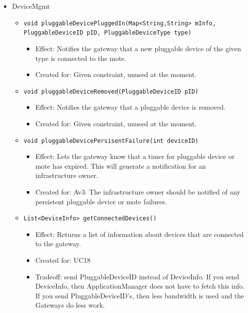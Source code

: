 \begin{itemize}
            \item DeviceMgmt
            \begin{itemize}
                \item \texttt{void pluggableDevicePluggedIn(Map<String,String> mInfo,
                                                            PluggableDeviceID pID,
                                                            PluggableDeviceType type)}
                    \begin{itemize}
                        \item Effect: Notifies the gateway that a new pluggable device
                              of the given type is connected to the mote.
                        \item Created for: Given constraint, unused at the moment.
                    \end{itemize}
                \item \texttt{void pluggableDeviceRemoved(PluggableDeviceID pID)}
                    \begin{itemize}
                        \item Effect: Notifies the gateway that a pluggable device is removed.
                        \item Created for: Given constraint, unused at the moment.
                    \end{itemize}
                \item \texttt{void pluggableDevicePersisentFailure(int deviceID)}
                    \begin{itemize}
                        \item Effect: Lets the gateway know that a timer for pluggable device or mote has expired.
                              This will generate a notification for an infrastructure owner.
                        \item Created for: Av3: The infrastructure owner should be notified of
                              any persistent pluggable device or mote failures.
                    \end{itemize}
                \item \texttt{List<DeviceInfo> getConnectedDevices()}
                    \begin{itemize}
                        \item Effect: Returns a list of information about devices that are connected to the gateway.
                        \item Created for: UC18
                        \item Tradeoff: send PluggableDeviceID instead of DeviceInfo.
                              If you send DeviceInfo, then ApplicationManager does
                              not have to fetch this info.
                              If you send PluggableDeviceID's, then less bandwidth
                              is used and the Gateways do less work.
                    \end{itemize}
            \end{itemize}


\end{itemize}
